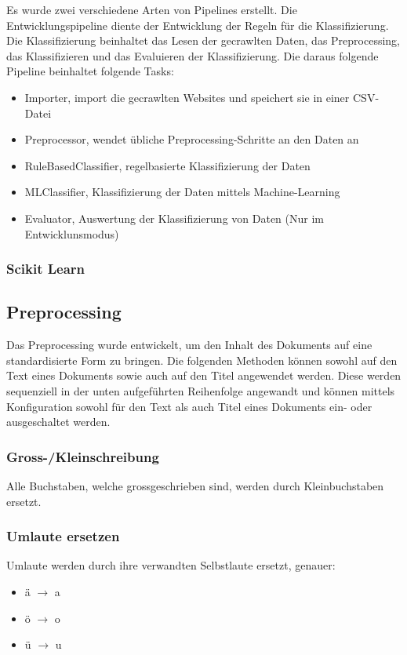 Es wurde zwei verschiedene Arten von Pipelines erstellt.
Die Entwicklungspipeline diente der Entwicklung der Regeln für die Klassifizierung.
Die Klassifizierung beinhaltet das Lesen der gecrawlten Daten, das Preprocessing, das Klassifizieren und das Evaluieren der Klassifizierung.
Die daraus folgende Pipeline beinhaltet folgende Tasks:
\begin{itemize}
	\item Importer, import die gecrawlten Websites und speichert sie in einer CSV-Datei
	\item Preprocessor, wendet übliche Preprocessing-Schritte an den Daten an
	\item RuleBasedClassifier, regelbasierte Klassifizierung der Daten 
	\item MLClassifier, Klassifizierung der Daten mittels Machine-Learning
	\item Evaluator, Auswertung der Klassifizierung von Daten (Nur im Entwicklunsmodus)
\end{itemize}
\subsubsection{Scikit Learn}
\subsection{Preprocessing}\label{preprocessing}
Das Preprocessing wurde entwickelt, um den Inhalt des Dokuments auf eine standardisierte Form zu bringen.
Die folgenden Methoden können sowohl auf den Text eines Dokuments sowie auch auf den Titel angewendet werden.
Diese werden sequenziell in der unten aufgeführten Reihenfolge angewandt und können mittels Konfiguration sowohl für den Text als auch Titel eines Dokuments ein- oder ausgeschaltet werden.
\subsubsection{Gross-/Kleinschreibung}
Alle Buchstaben, welche grossgeschrieben sind, werden durch Kleinbuchstaben ersetzt.
\subsubsection{Umlaute ersetzen}
Umlaute werden durch ihre verwandten Selbstlaute ersetzt, genauer:
\begin{itemize}
	\item ä $\rightarrow$ a
	\item ö $\rightarrow$ o
	\item ü $\rightarrow$ u
\end{itemize} 
